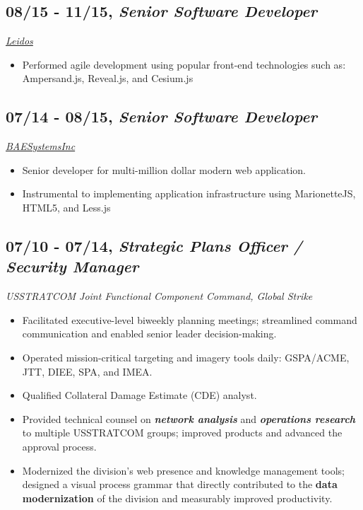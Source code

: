 \documentclass[10pt]{article}
\def\tightlist{}
\begin{document}
\subsection{\texorpdfstring{08/15 - 11/15, \textbf{\emph{Senior Software
Developer}}}{08/15 - 11/15, Senior Software Developer}}\label{senior-software-developer}

\emph{\href{https://twitter.com/LeidosInc}{Leidos}}

\begin{itemize}
\tightlist
\item
  Performed agile development using popular front-end technologies such
  as: Ampersand.js, Reveal.js, and Cesium.js
\end{itemize}

\subsection{\texorpdfstring{07/14 - 08/15, \textbf{\emph{Senior Software
Developer}}}{07/14 - 08/15, Senior Software Developer}}\label{senior-software-developer-1}

\emph{\href{https://twitter.com/BAESystemsInc}{BAESystemsInc}}

\begin{itemize}
\tightlist
\item
  Senior developer for multi-million dollar modern web application.
\item
  Instrumental to implementing application infrastructure using
  MarionetteJS, HTML5, and Less.js
\end{itemize}

\subsection{\texorpdfstring{07/10 - 07/14, \textbf{\emph{Strategic Plans
Officer / Security
Manager}}}{07/10 - 07/14, Strategic Plans Officer / Security Manager}}\label{strategic-plans-officer-security-manager}

\emph{USSTRATCOM Joint Functional Component Command, Global Strike}

\begin{itemize}
\tightlist
\item
  Facilitated executive-level biweekly planning meetings; streamlined
  command communication and enabled senior leader decision-making.
\item
  Operated mission-critical targeting and imagery tools daily:
  GSPA/ACME, JTT, DIEE, SPA, and IMEA.
\item
  Qualified Collateral Damage Estimate (CDE) analyst.
\item
  Provided technical counsel on \textbf{\emph{network analysis}} and
  \textbf{\emph{operations research}} to multiple USSTRATCOM groups;
  improved products and advanced the approval process.
\item
  Modernized the division's web presence and knowledge management tools;
  designed a visual process grammar that directly contributed to the
  \textbf{data modernization} of the division and measurably improved
  productivity.
\end{itemize}
\end{document}
